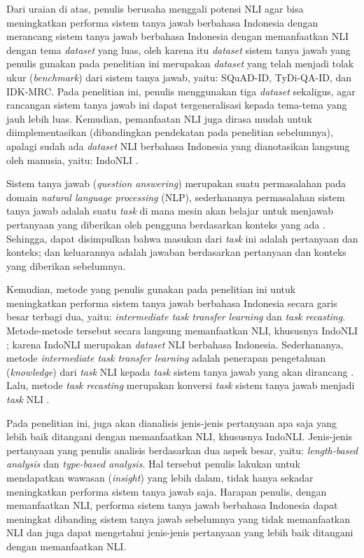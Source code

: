 Dari uraian di atas, penulis berusaha menggali potensi NLI agar bisa meningkatkan performa sistem tanya jawab berbahasa Indonesia dengan merancang sistem tanya jawab berbahasa Indonesia dengan memanfaatkan NLI dengan tema \emph{dataset} yang luas, oleh karena itu \emph{dataset} sistem tanya jawab yang penulis gunakan pada penelitian ini merupakan \emph{dataset} yang telah menjadi tolak ukur (\emph{benchmark}) dari sistem tanya jawab, yaitu: SQuAD-ID, TyDi-QA-ID, dan IDK-MRC. Pada penelitian ini, penulis menggunakan tiga \emph{dataset} sekaligus, agar rancangan sistem tanya jawab ini dapat tergeneralisasi kepada tema-tema yang jauh lebih luas. Kemudian, pemanfaatan NLI juga dirasa mudah untuk diimplementasikan (dibandingkan pendekatan pada penelitian sebelumnya), apalagi sudah ada \emph{dataset} NLI berbahasa Indonesia yang dianotasikan langsung oleh manusia, yaitu: IndoNLI \citep{mahendra-etal-2021-indonli}.

 Sistem tanya jawab (\emph{question answering}) merupakan suatu permasalahan pada domain \emph{natural language processing} (NLP), sederhananya permasalahan sistem tanya jawab adalah suatu \emph{task} di mana mesin akan belajar untuk menjawab pertanyaan yang diberikan oleh pengguna berdasarkan konteks yang ada \citep{stroh2016question}. Sehingga, dapat disimpulkan bahwa masukan dari \emph{task} ini adalah pertanyaan dan konteks; dan keluarannya adalah jawaban berdasarkan pertanyaan dan konteks yang diberikan sebelumnya. 

Kemudian, metode yang penulis gunakan pada penelitian ini untuk meningkatkan performa sistem tanya jawab berbahasa Indonesia secara garis besar terbagi dua, yaitu: \emph{intermediate task transfer learning} dan \emph{task recasting}. Metode-metode tersebut secara langsung memanfaatkan NLI, khususnya IndoNLI \citep{mahendra-etal-2021-indonli}; karena IndoNLI merupakan \emph{dataset} NLI berbahasa Indonesia. Sederhananya, metode \emph{intermediate task transfer learning} adalah penerapan pengetahuan (\emph{knowledge}) dari \emph{task} NLI kepada \emph{task} sistem tanya jawab yang akan dirancang \citep{pruksachatkun-etal-2020-intermediate}. Lalu, metode \emph{task recasting} merupakan konversi \emph{task} sistem tanya jawab menjadi \emph{task} NLI \citep{chen-etal-2021-nli-models}.

Pada penelitian ini, juga akan dianalisis jenis-jenis pertanyaan apa saja yang  lebih baik ditangani dengan memanfaatkan NLI, khususnya IndoNLI. Jenis-jenis pertanyaan yang penulis analisis berdasarkan dua aspek besar, yaitu: \emph{length-based analysis} dan \emph{type-based analysis}. Hal tersebut penulis lakukan untuk mendapatkan wawasan (\emph{insight}) yang lebih dalam, tidak hanya sekadar meningkatkan performa sistem tanya jawab saja. Harapan penulis, dengan memanfaatkan NLI, performa sistem tanya jawab berbahasa Indonesia dapat meningkat dibanding sistem tanya jawab sebelumnya yang tidak memanfaatkan NLI dan juga dapat mengetahui jenis-jenis pertanyaan yang lebih baik ditangani dengan memanfaatkan NLI.

